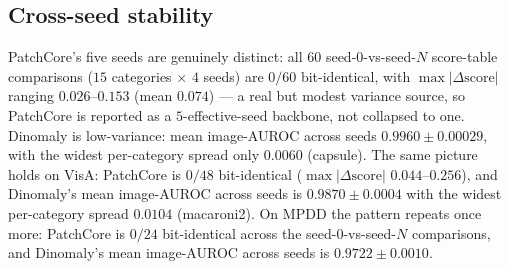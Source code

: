 \documentclass[preprint,11pt]{elsarticle}
\begin{document}
\begin{table}[!htbp]
  \centering
  \caption{Reproduction gate, $5$ seeds per backbone per benchmark. Mean image-AUROC range is
  over seeds; the weakest category is named. ``n/a'': no repo-confirmed published
  PatchCore-on-VisA/MPDD figure exists, so that row is descriptive by design (no pass/fail graded).
  Recomputed from the frozen MVTec AD, VisA, and MPDD analysis summaries.}
  \label{tab:repro}
  \small
\end{table}
\FloatBarrier

\subsection{Cross-seed stability}
\label{sec:seed}

PatchCore's five seeds are genuinely distinct: all $60$ seed-0-vs-seed-$N$ score-table comparisons
($15$ categories $\times$ $4$ seeds) are $0/60$ bit-identical, with $\max|\Delta\text{score}|$
ranging $0.026$--$0.153$ (mean $0.074$) --- a real but modest variance source, so PatchCore is
reported as a $5$-effective-seed backbone, not collapsed to one. Dinomaly is low-variance: mean
image-AUROC across seeds $0.9960 \pm 0.00029$, with the widest per-category spread only $0.0060$
(capsule). The same picture holds on VisA: PatchCore is $0/48$ bit-identical
($\max|\Delta\text{score}|$ $0.044$--$0.256$), and Dinomaly's mean image-AUROC across seeds is
$0.9870 \pm 0.0004$ with the widest per-category spread $0.0104$ (macaroni2). On MPDD the pattern
repeats once more: PatchCore is $0/24$ bit-identical across the seed-0-vs-seed-$N$ comparisons,
and Dinomaly's mean image-AUROC across seeds is $0.9722 \pm 0.0010$.
\end{document}
